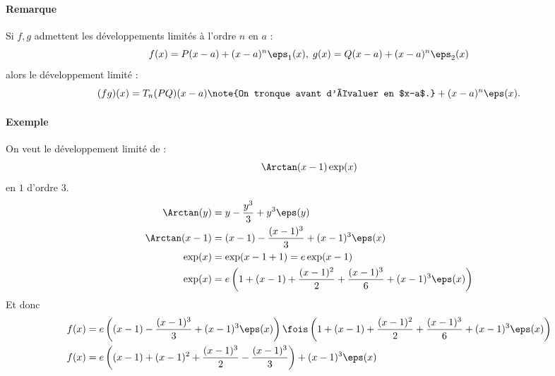 \documentclass{mybourbaki}
\begin{document}
\paragraph{Remarque}Si $f,g$ admettent les développements limités à l'ordre $n$ en $a$ : \[ f(x) = P(x-a) + (x-a)^{n}\eps_1(x), \; g(x) = Q(x-a) + (x-a)^{n} \eps_2(x)\]alors le développement limité : \[ (fg)(x)  = T_n(PQ)(x-a)\note{On tronque avant d'évaluer en $x-a$.} + (x-a)^{n}\eps(x). \]

\paragraph{Exemple}On veut le développement limité de : \[ \Arctan(x-1)\exp(x)\]en $1$ d'ordre $3$.
\begin{align*}
\Arctan(y) &= y - \frac{y^{3}}{3} +y^{3}\eps(y) \\ 
\Arctan(x-1) &= (x-1) - \frac{(x-1)^{3}}{3}+(x-1)^{3}\eps(x) \\
\exp(x) &= \exp(x-1+1) = e\exp(x-1) \\
\exp(x) &= e\left(  1 + (x-1) + \frac{(x-1)^{2}}{2} + \frac{(x-1)^{3}}{6} + (x-1)^{3}\eps(x)\right)
\end{align*}
Et donc 
\begin{align*}
f(x) &= e\left( (x-1) - \frac{(x-1)^{3}}{3} + (x-1)^{3}\eps(x) \right)\fois \left( 1 + (x-1) + \frac{(x-1)^{2}}{2} + \frac{(x-1)^{3}}{6} + (x-1)^{3}\eps(x) \right)\\
f(x) &= e\left( (x-1) + (x-1)^{2} + \frac{(x-1)^{3}}{2} - \frac{(x-1)^{3}}{3} \right) + (x-1)^{3}\eps(x)
\end{align*}
\end{document}
